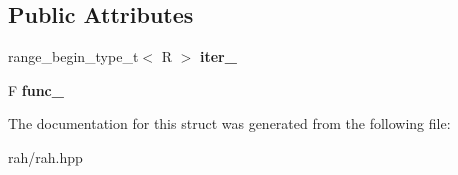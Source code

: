 \subsection*{Public Attributes}
\begin{DoxyCompactItemize}
\item 
\mbox{\label{struct_r_a_h___n_a_m_e_s_p_a_c_e_1_1view_1_1transform__iterator_a93cb5f63a7eb446bd2275ea21a00519d}} 
range\+\_\+begin\+\_\+type\+\_\+t$<$ R $>$ {\bfseries iter\+\_\+}
\item 
\mbox{\label{struct_r_a_h___n_a_m_e_s_p_a_c_e_1_1view_1_1transform__iterator_a710e156dfc00b745237dd3b725fb6c43}} 
F {\bfseries func\+\_\+}
\end{DoxyCompactItemize}


The documentation for this struct was generated from the following file\+:\begin{DoxyCompactItemize}
\item 
rah/rah.\+hpp\end{DoxyCompactItemize}
